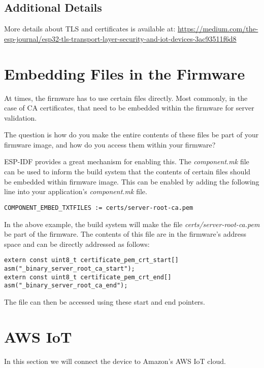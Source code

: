 \documentclass[main.tex]{subfiles}
\begin{document}
\subsection{Additional Details}

More details about TLS and certificates is available at: \url{https://medium.com/the-esp-journal/esp32-tls-transport-layer-security-and-iot-devices-3ac93511f6d8}

\section{Embedding Files in the Firmware}\label{sec:embedding_files}
At times, the firmware has to use certain files directly. Most commonly, in the case of CA certificates, that need to be embedded within the firmware for server validation.

The question is how do you make the entire contents of these files be part of your firmware image, and how do you access them within your firmware?

ESP-IDF provides a great mechanism for enabling this. The \textit{component.mk} file can be used to inform the build system that the contents of certain files should be embedded within firmware image. This can be enabled by adding the following line into your application's \textit{component.mk} file.

\begin{verbatim}
COMPONENT_EMBED_TXTFILES := certs/server-root-ca.pem 
\end{verbatim}

In the above example, the build system will make the file \textit{certs/server-root-ca.pem} be part of the firmware. The contents of this file are in the firmware's address space and can be directly addressed as follows:
\begin{verbatim}
extern const uint8_t certificate_pem_crt_start[] asm("_binary_server_root_ca_start");
extern const uint8_t certificate_pem_crt_end[] asm("_binary_server_root_ca_end");
\end{verbatim}

The file can then be accessed using these start and end pointers.

\section{AWS IoT}
In this section we will connect the device to Amazon's AWS IoT cloud. 
\end{document}
